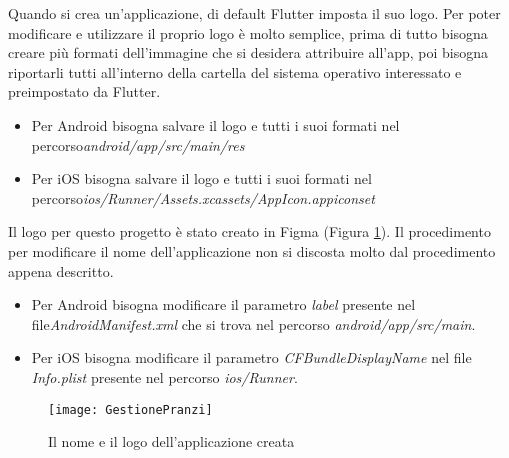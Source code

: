Quando si crea un'applicazione, di default Flutter imposta il suo logo.\newline
Per poter modificare e utilizzare il proprio logo è molto semplice, prima di tutto bisogna creare più formati dell'immagine che si desidera attribuire all'app, poi bisogna riportarli tutti all'interno della cartella del sistema operativo interessato e preimpostato da Flutter.
\begin{itemize}
    \item Per Android bisogna salvare il logo e tutti i suoi formati nel percorso\newline \emph{android/app/src/main/res}
    \item Per iOS bisogna salvare il logo e tutti i suoi formati nel percorso\newline \emph{ios/Runner/Assets.xcassets/AppIcon.appiconset}
\end{itemize}
Il logo per questo progetto è stato creato in Figma (Figura \ref{fig:logo-nome}).\newline
\newline
Il procedimento per modificare il nome dell'applicazione non si discosta molto dal procedimento appena descritto.
\begin{itemize}
    \item Per Android bisogna modificare il parametro \emph{label} presente nel file\newline \emph{AndroidManifest.xml} che si trova nel percorso \emph{android/app/src/main}.
    \item Per iOS bisogna modificare il parametro \emph{CFBundleDisplayName} nel file \emph{Info.plist} presente nel percorso \emph{ios/Runner}.
\end{itemize}
\begin{figure}[!h] 
    \centering 
    \texttt{[image: GestionePranzi]} 
    \caption{Il nome e il logo dell'applicazione creata}
    \label{fig:logo-nome}
\end{figure}



